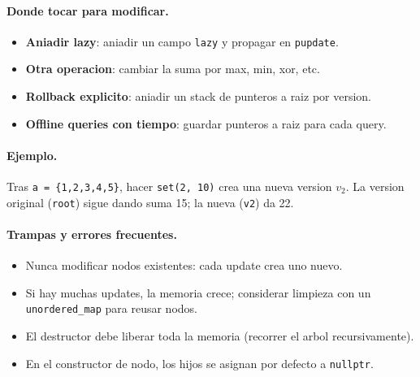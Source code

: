 \paragraph{Donde tocar para modificar.}
\begin{itemize}\setlength\itemsep{0pt}
	\item \textbf{Aniadir lazy}: aniadir un campo \texttt{lazy} y propagar en \texttt{pupdate}.
	\item \textbf{Otra operacion}: cambiar la suma por max, min, xor, etc.
	\item \textbf{Rollback explicito}: aniadir un stack de punteros a raiz por version.
	\item \textbf{Offline queries con tiempo}: guardar punteros a raiz para cada query.
\end{itemize}

\paragraph{Ejemplo.}
Tras \texttt{a = \{1,2,3,4,5\}}, hacer \texttt{set(2, 10)} crea una nueva version $v_2$. La version original (\texttt{root}) sigue dando suma 15; la nueva (\texttt{v2}) da 22.

\paragraph{Trampas y errores frecuentes.}
\begin{itemize}\setlength\itemsep{0pt}
	\item Nunca modificar nodos existentes: cada update crea uno nuevo.
	\item Si hay muchas updates, la memoria crece; considerar limpieza con un \texttt{unordered\_map} para reusar nodos.
	\item El destructor debe liberar toda la memoria (recorrer el arbol recursivamente).
	\item En el constructor de nodo, los hijos se asignan por defecto a \texttt{nullptr}.
\end{itemize}

